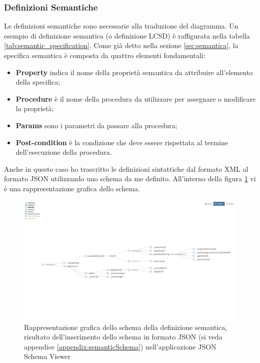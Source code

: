             \subsubsection{Definizioni Semantiche}
                Le definizioni semantiche sono necessarie alla traduzione del diagramma. Un esempio di definizione semantica (o definizione LCSD) è raffigurata nella tabella \ref{tab:semantic_specification}. Come già detto nella sezione \ref{sec:semantica}, la specifica semantica è composta da quattro elementi fondamentali: 
                \begin{itemize}
                    \item \textbf{Property} indica il nome della proprietà semantica da attribuire all'elemento della specifica;
                    \item \textbf{Procedure} è il nome della procedura da utilizzare per assegnare o modificare la proprietà;
                    \item \textbf{Params} sono i parametri da passare alla procedura;
                    \item \textbf{Post-condition} è la condizione che deve essere rispettata al termine dell'esecuzione della procedura.
                \end{itemize}
                Anche in questo caso ho trascritto le definizioni sintattiche dal formato XML al formato JSON utilizzando uno schema da me definito. All'interno della figura \ref{fig:semanticSchema} vi è una rappresentazione grafica dello schema.

                \begin{figure}[]
                    \centering
                    \includegraphics[scale=0.45,angle=90,origin=c]{Figure/schema/semanticSchema.PNG}
                    \caption{Rappresentazione grafica dello schema della definizione semantica, risultato dell'inserimento dello schema in formato JSON (si veda appendice \ref{appendix:semanticSchema}) nell'applicazione JSON Schema Viewer \cite{jsonschema}}
                    \label{fig:semanticSchema}
                \end{figure}
                \newpage

